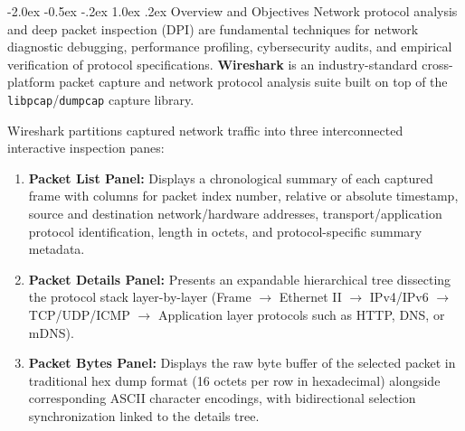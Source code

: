 \documentclass[11pt,a4paper]{article}
\makeatletter
\renewcommand\section{\@startsection {section}{1}{\z@}%
  {-2.0ex \@plus -0.5ex \@minus -.2ex}%
  {1.0ex \@plus .2ex}%
  {\normalfont\Large\bfseries}}
\makeatother
\begin{document}
\section{Overview and Objectives}
Network protocol analysis and deep packet inspection (DPI) are fundamental techniques for network diagnostic debugging, performance profiling, cybersecurity audits, and empirical verification of protocol specifications. \textbf{Wireshark} is an industry-standard cross-platform packet capture and network protocol analysis suite built on top of the \texttt{libpcap}/\texttt{dumpcap} capture library.

Wireshark partitions captured network traffic into three interconnected interactive inspection panes:
\begin{enumerate}
  \item \textbf{Packet List Panel:} Displays a chronological summary of each captured frame with columns for packet index number, relative or absolute timestamp, source and destination network/hardware addresses, transport/application protocol identification, length in octets, and protocol-specific summary metadata.
  \item \textbf{Packet Details Panel:} Presents an expandable hierarchical tree dissecting the protocol stack layer-by-layer (Frame $\rightarrow$ Ethernet II $\rightarrow$ IPv4/IPv6 $\rightarrow$ TCP/UDP/ICMP $\rightarrow$ Application layer protocols such as HTTP, DNS, or mDNS).
  \item \textbf{Packet Bytes Panel:} Displays the raw byte buffer of the selected packet in traditional hex dump format (16 octets per row in hexadecimal) alongside corresponding ASCII character encodings, with bidirectional selection synchronization linked to the details tree.
\end{enumerate}
\end{document}
